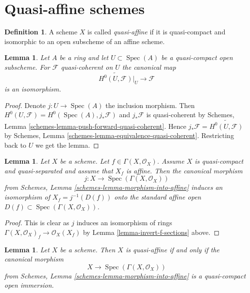 \documentclass{stacks-project}
\theoremstyle{plain}
\newtheorem{lemma}[subsection]{Lemma}
\theoremstyle{definition}
\newtheorem{definition}[subsection]{Definition}
\theoremstyle{remark}
\numberwithin{equation}{subsection}
\def\Spec{\mathop{\mathrm{Spec}}}
\begin{document}
\section{Quasi-affine schemes}
\label{section-quasi-affine}

\begin{definition}
\label{definition-quasi-affine}
A scheme $X$ is called {\it quasi-affine} if it is quasi-compact
and isomorphic to an open subscheme of an affine scheme.
\end{definition}

\begin{lemma}
\label{lemma-quasi-coherent-quasi-affine}
Let $A$ be a ring and let $U \subset \Spec(A)$ be a quasi-compact
open subscheme. For $\mathcal{F}$ quasi-coherent on $U$ the canonical map
$$
\widetilde{H^0(U, \mathcal{F})}|_U \to \mathcal{F}
$$
is an isomorphism.
\end{lemma}

\begin{proof}
Denote $j : U \to \Spec(A)$ the inclusion morphism. Then
$H^0(U, \mathcal{F}) = H^0(\Spec(A), j_*\mathcal{F})$ and
$j_*\mathcal{F}$ is quasi-coherent by
Schemes, Lemma \ref{schemes-lemma-push-forward-quasi-coherent}.
Hence $j_*\mathcal{F} = \widetilde{H^0(U, \mathcal{F})}$ by
Schemes, Lemma \ref{schemes-lemma-equivalence-quasi-coherent}.
Restricting back to $U$ we get the lemma.
\end{proof}

\begin{lemma}
\label{lemma-invert-f-affine}
Let $X$ be a scheme. Let $f \in \Gamma(X, \mathcal{O}_X)$.
Assume $X$ is quasi-compact and quasi-separated and assume that
$X_f$ is affine. Then the canonical morphism
$$
j : X \longrightarrow \Spec(\Gamma(X, \mathcal{O}_X))
$$
from Schemes, Lemma \ref{schemes-lemma-morphism-into-affine}
induces an isomorphism of $X_f = j^{-1}(D(f))$ onto the standard affine
open $D(f) \subset \Spec(\Gamma(X, \mathcal{O}_X))$.
\end{lemma}

\begin{proof}
This is clear as $j$ induces an isomorphism of rings
$\Gamma(X, \mathcal{O}_X)_f \to \mathcal{O}_X(X_f)$ by
Lemma \ref{lemma-invert-f-sections} above.
\end{proof}

\begin{lemma}
\label{lemma-quasi-affine}
Let $X$ be a scheme. Then $X$ is quasi-affine if and only if
the canonical morphism
$$
X \longrightarrow \Spec(\Gamma(X, \mathcal{O}_X))
$$
from Schemes, Lemma \ref{schemes-lemma-morphism-into-affine} is
a quasi-compact open immersion.
\end{lemma}
\end{document}
